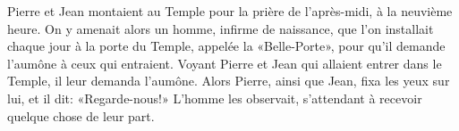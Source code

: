 Pierre et Jean montaient au Temple pour la prière de l’après-midi,
	à la neuvième heure.
On y amenait alors un homme, infirme de naissance,
	que l’on installait chaque jour
		à la porte du Temple, appelée la «Belle-Porte»,
	pour qu’il demande l’aumône à ceux qui entraient.
Voyant Pierre et Jean qui allaient entrer dans le Temple,
	il leur demanda l’aumône.
Alors Pierre, ainsi que Jean, fixa les yeux sur lui, et il dit:
	«Regarde-nous!»
L’homme les observait, s’attendant à recevoir quelque chose de leur part.
